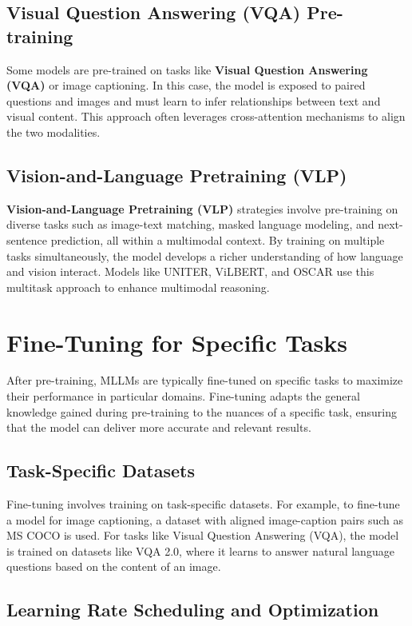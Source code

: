 \subsection{Visual Question Answering (VQA) Pre-training}

Some models are pre-trained on tasks like \textbf{Visual Question Answering (VQA)} or image captioning. In this case, the model is exposed to paired questions and images and must learn to infer relationships between text and visual content. This approach often leverages cross-attention mechanisms to align the two modalities.

\subsection{Vision-and-Language Pretraining (VLP)}

\textbf{Vision-and-Language Pretraining (VLP)} strategies involve pre-training on diverse tasks such as image-text matching, masked language modeling, and next-sentence prediction, all within a multimodal context. By training on multiple tasks simultaneously, the model develops a richer understanding of how language and vision interact. Models like UNITER, ViLBERT, and OSCAR use this multitask approach to enhance multimodal reasoning.

\section{Fine-Tuning for Specific Tasks}

After pre-training, MLLMs are typically fine-tuned on specific tasks to maximize their performance in particular domains. Fine-tuning adapts the general knowledge gained during pre-training to the nuances of a specific task, ensuring that the model can deliver more accurate and relevant results.

\subsection{Task-Specific Datasets}

Fine-tuning involves training on task-specific datasets. For example, to fine-tune a model for image captioning, a dataset with aligned image-caption pairs such as MS COCO is used. For tasks like Visual Question Answering (VQA), the model is trained on datasets like VQA 2.0, where it learns to answer natural language questions based on the content of an image.

\subsection{Learning Rate Scheduling and Optimization}

